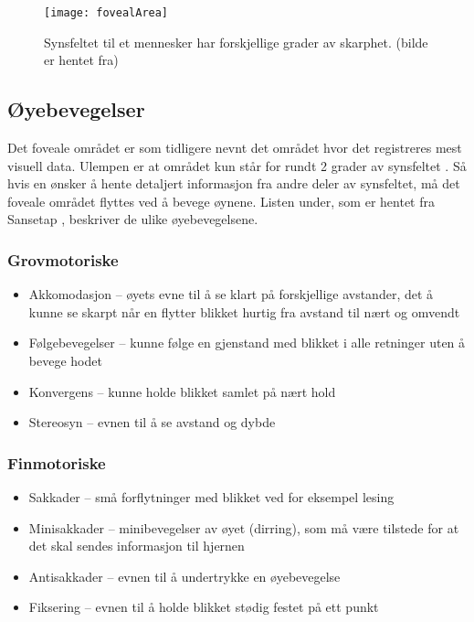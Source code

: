\begin{figure}[ht!]
\centering
\texttt{[image: fovealArea]}
\caption{Synsfeltet til et mennesker har forskjellige grader av skarphet. (bilde er hentet fra\cite{VisualImage})}
\label{fig:visueltArea}
\end{figure}

\subsection{Øyebevegelser}

Det foveale området er som tidligere nevnt det området hvor det registreres mest visuell data. Ulempen er at området kun står for rundt 2 grader av synsfeltet \cite{Backg0:online}. Så hvis en ønsker å hente detaljert informasjon fra andre deler av synsfeltet, må det foveale området flyttes ved å bevege øynene. Listen under, som er hentet fra Sansetap \cite{sanse7:online}, beskriver de ulike øyebevegelsene.


\subsubsection{Grovmotoriske}
\begin{itemize}
\item Akkomodasjon – øyets evne til å se klart på forskjellige avstander, det å kunne se skarpt når en flytter blikket hurtig fra avstand til nært og omvendt
\item Følgebevegelser – kunne følge en gjenstand med blikket i alle retninger uten å bevege hodet
\item Konvergens – kunne holde blikket samlet på nært hold
\item Stereosyn – evnen til å se avstand og dybde
\end{itemize}
\subsubsection{Finmotoriske}
\begin{itemize}
\item Sakkader – små forflytninger med blikket ved for eksempel lesing
\item Minisakkader – minibevegelser av øyet (dirring), som må være tilstede for at det skal sendes informasjon til hjernen
\item Antisakkader – evnen til å undertrykke en øyebevegelse
\item Fiksering – evnen til å holde blikket stødig festet på ett punkt
\end{itemize}



